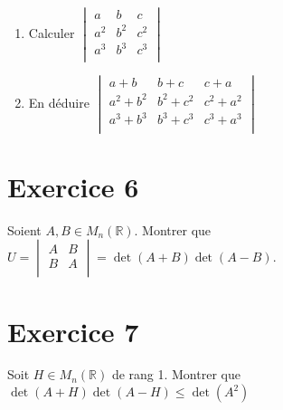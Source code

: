 \documentclass[11pt]{article}
\begin{document}
\begin{enumerate}
\item Calculer $ \begin{vmatrix}
a & b & c \\
a^2 & b^2 & c^2 \\
a^3 & b^3 & c^3 \\
\end{vmatrix}$
\item En déduire $ \begin{vmatrix}
a+b & b+c & c+a \\
a^2+b^2 & b^2+c^2 & c^2+a^2 \\
a^3+b^3 & b^3+c^3 & c^3+a^3 \\
\end{vmatrix}$
\end{enumerate}

\section*{Exercice 6}

Soient $A,B\in M_n(\mathbb{R})$. Montrer que $U = \begin{vmatrix}
A & B\\
B & A\\
\end{vmatrix} = \det(A+B)\det(A-B)$.

\section*{Exercice 7}

Soit $H\in M_n(\mathbb{R})$ de rang 1. Montrer que $\det(A+H)\det(A-H)\leq \det(A^2)$
\end{document}
